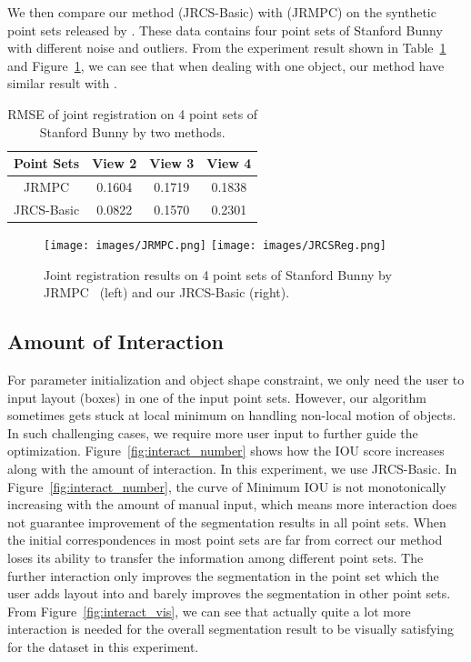 We then compare our method (JRCS-Basic) with \cite{Evangelidis2014}(JRMPC) on the synthetic point sets released by \cite{Evangelidis2014}. These data contains four point sets of Stanford Bunny with different noise and outliers. From the experiment result shown in Table~\ref{tab:reg} and Figure~\ref{fig:reg}, we can see that when dealing with one object, our method have similar result with \cite{Evangelidis2014}.

\begin{table}
	\centering
	\caption{RMSE of joint registration on 4 point sets of Stanford Bunny by two methods.}
	\begin{tabular}{c c c c}
		Point Sets& View 2 & View 3 & View 4 \\
		\hline
		JRMPC & 0.1604 & 0.1719 & 0.1838\\   
		JRCS-Basic & 0.0822 &  0.1570  & 0.2301\\
	\end{tabular}
	\label{tab:reg}
\end{table}
\begin{figure}[htb]
	\centering
	\texttt{[image: images/JRMPC.png]}
	\texttt{[image: images/JRCSReg.png]}
	\caption{Joint registration results on 4 point sets of Stanford Bunny by JRMPC~\cite{Evangelidis2014} (left) and our JRCS-Basic (right).}
	\label{fig:reg}
\end{figure}

\subsection{Amount of Interaction}
\label{subsec:interact}

For parameter initialization and object shape constraint, we only need the user to input layout (boxes) in one of the input point sets. However, our algorithm sometimes gets stuck at local minimum on handling non-local motion of objects. In such challenging cases, we require more user input to further guide the optimization. Figure~\ref{fig:interact_number} shows how the IOU score increases along with the amount of interaction. In this experiment, we use JRCS-Basic. In Figure~\ref{fig:interact_number}, the curve of Minimum IOU is not monotonically increasing with the amount of manual input, which means more interaction does not guarantee improvement of the segmentation results in all point sets.  When the initial correspondences in most point sets are far from correct our method loses its ability to transfer the information among different point sets. The further interaction only improves the segmentation in the point set which the user adds layout into and barely improves the segmentation in other point sets.
From Figure~\ref{fig:interact_vis}, we can see that actually quite a lot more interaction is needed for the overall segmentation result to be visually satisfying for the dataset in this experiment.
 
